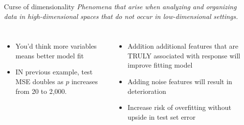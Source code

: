 \documentclass[aspectratio=169,usenames,dvipsnames]{beamer}
\newcommand{\InstructorList}[1]{
\begin{itemize}
	\color{orange}
	#1
\end{itemize}
}
\begin{document}
\begin{frame}[t]{Curse of dimensionality}
\textit{Phenomena that arise when analyzing and organizing data in high-dimensional spaces that do not occur in low-dimensional settings.}
\begin{columns}
\centering

\InstructorList{
  \item You'd think more variables means better model fit
	\item IN previous example, test MSE doubles as $p$ increases from 20 to 2,000.
}

\centering

\InstructorList{
	\item Addition additional features that are TRULY associated with response will improve fitting model
  \item Adding noise features will result in deterioration
	\item Increase risk of overfitting without upside in test set error
}


\end{columns}

\end{frame}
\end{document}
